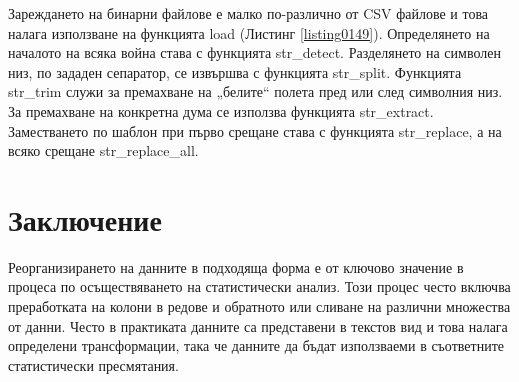 Зареждането на бинарни файлове е малко по-различно от CSV файлове и това налага използване на функцията load (Листинг \ref{listing0149}). Определянето на началото на всяка война става с функцията str\_detect. Разделянето на символен низ, по зададен сепаратор, се извършва с функцията str\_split.  Функцията str\_trim служи за премахване на „белите“ полета пред или след символния низ. За премахване на конкретна дума се използва функцията str\_extract. Заместването по шаблон при първо срещане става с функцията str\_replace, а на всяко срещане str\_replace\_all.

\section*{Заключение}

Реорганизирането на данните в подходяща форма е от ключово значение в процеса по осъществяването на статистически анализ. Този процес често включва преработката на колони в редове и обратното или сливане на различни множества от данни. Често в практиката данните са представени в текстов вид и това налага определени трансформации, така че данните да бъдат използваеми в съответните статистически пресмятания.

